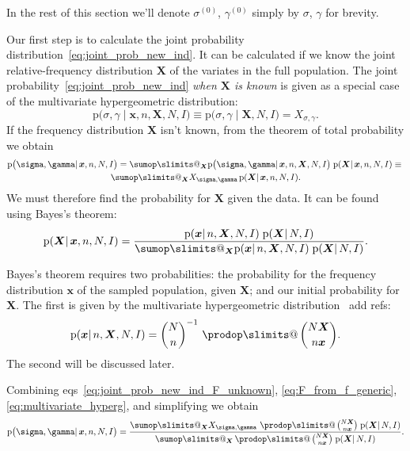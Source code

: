 \documentclass[\ifafour a4paper,12pt,\else a5paper,10pt,\fi%
onecolumn,oneside,article,%
british%
]{memoir}
\makeatletter
\theoremstyle{remark}
\theoremstyle{innote}
\def\sum{\DOTSI\sumop\slimits@}
\def\prod{\DOTSI\prodop\slimits@}
\newcommand*{\pf}{\mathrm{p}}%
\renewcommand*{\|}{\mathpunct{|}}
\newcommand*{\eqns}{eqs}%
\newcommand*{\tprod}{\mathop{\textstyle\prod}\nolimits}
\newcommand*{\puzzle}{\maltese}
\newcommand{\mynote}[1]{ {\color{notecolour}\puzzle\ #1}}
\newcommand*{\yI}{I}
\newcommand*{\yprod}{\tprod}
\newcommand*{\ys}{\sigma}
\newcommand*{\yg}{\gamma}
\newcommand*{\ysi}[1]{\ys^{(#1)}}
\newcommand*{\ygi}[1]{\yg^{(#1)}}
\newcommand*{\yso}{\ys}
\newcommand*{\ygo}{\yg}
\newcommand*{\yF}{\bm{X}}
\newcommand*{\yf}{\bm{x}}
\makeatother
\begin{document}
In the rest of this section we'll denote $\ysi{0}$, $\ygi{0}$ simply by
$\yso$, $\ygo$ for brevity.

\medskip

Our first step is to calculate the joint probability
distribution~\eqref{eq:joint_prob_new_ind}. It can be calculated if we know
the joint relative-frequency distribution $\yF$ of the variates in the full
population. The joint probability~\eqref{eq:joint_prob_new_ind} \emph{when
  $\yF$ is known} is given as a special case of the multivariate
hypergeometric distribution:
\begin{equation}
  \label{eq:joint_prob_new_ind_hyperg}
  \pf\bigl(\yso, \ygo \| \yf, n,\yF,N, \yI\bigr) \equiv
  \pf\bigl(\yso, \ygo \| \yF,N, \yI\bigr) 
  =X_{\yso, \ygo}.
\end{equation}
If the frequency distribution $\yF$ isn't known, from the theorem of total
probability we obtain
\begin{multline}
  \label{eq:joint_prob_new_ind_F_unknown}
  \pf\bigl(\yso, \ygo \| \yf, n,N, \yI\bigr)  =
  \sum_{\yF}  \pf\bigl(\yso, \ygo \| \yf, n,\yF,N, \yI\bigr) \;
  \pf( \yF \| \yf, n,N, \yI) \equiv{}\\
  \sum_{\yF}  X_{\yso, \ygo}\,  \pf( \yF \| \yf, n,N, \yI).
\end{multline}
We must therefore find the probability for $\yF$ given the data. It can
be found using Bayes's theorem:
\begin{equation}
  \label{eq:F_from_f_generic}
  \pf(\yF \| \yf, n, N,\yI) =
  \frac{\pf(\yf \| n,\yF, N,\yI)\; \pf(\yF \| N,\yI)}{
  \sum_{\yF}\pf(\yf \| n,\yF, N,\yI)\; \pf(\yF \| N,\yI)}.
\end{equation}

Bayes's theorem requires two probabilities: the probability for the
frequency distribution $\yf$ of the sampled population, given $\yF$; and
our initial probability for $\yF$. The first is given by the multivariate
hypergeometric distribution\mynote{add refs}:
\begin{equation}
  \label{eq:multivariate_hyperg}
  \pf(\yf \| n,\yF, N,\yI) =
\binom{N}{n}^{-1}\,\yprod\binom{N\yF}{n\yf}.
\end{equation}
The second will be discussed later.

Combining \eqns~\eqref{eq:joint_prob_new_ind_F_unknown},
\eqref{eq:F_from_f_generic}, \eqref{eq:multivariate_hyperg}, and
simplifying we obtain
\begin{equation}
  \label{eq:joint_prob_new_ind_full}
  \pf\bigl(\yso, \ygo \| \yf, n,N, \yI\bigr)  =
  \frac{
    \sum_{\yF} X_{\yso, \ygo}\,
    \yprod\binom{N\yF}{n\yf}\; \pf(\yF \| N,\yI)}{
  \sum_{\yF} \yprod\binom{N\yF}{n\yf}\; \pf(\yF \| N,\yI)}.
\end{equation}
\end{document}
